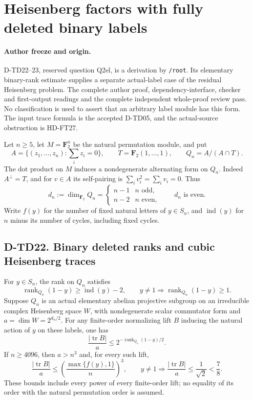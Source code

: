 \section{Heisenberg factors with fully deleted binary labels}
\label{sec:heisenberg-deleted-labels}

\paragraph{Author freeze and origin.}
D-TD22--23, reserved question Q2el, is a derivation by
\texttt{/root}. Its elementary binary-rank estimate supplies a
separate actual-label case of the residual Heisenberg problem.
The complete author proof, dependency-interface, checker and first-output
readings and the complete independent whole-proof review pass.
No classification is used to assert that an arbitrary label module
has this form. The input trace formula is the accepted D-TD05,
and the actual-source obstruction is HD-FT27.

Let $n\ge5$, let $M=\mathbf F_2^n$ be the natural permutation
module, and put
\[
 A=\{(z_1,\ldots,z_n):\textstyle\sum_i z_i=0\},\qquad
 T=\mathbf F_2(1,\ldots,1),\qquad
 Q_n=A/(A\cap T).
 \tag{TDB.1}
\]
The dot product on $M$ induces a nondegenerate alternating form
on $Q_n$. Indeed $A^\perp=T$, and for $v\in A$ its self-pairing
is $\sum_i v_i^2=\sum_i v_i=0$. Thus
\[
 d_n:=\dim_{\mathbf F_2}Q_n=
 \begin{cases}n-1&n\text{ odd},\\n-2&n\text{ even},\end{cases}
 \qquad d_n\text{ is even}.
 \tag{TDB.2}
\]
Write $f(y)$ for the number of fixed natural letters of $y\in S_n$,
and $\operatorname{ind}(y)$ for $n$ minus its number of cycles,
including fixed cycles.

\subsection*{D-TD22. Binary deleted ranks and cubic Heisenberg traces}

\begin{lemma}[D-TD22]
For $y\in S_n$, the rank on $Q_n$ satisfies
\[
 \operatorname{rank}_{Q_n}(1-y)\ge\operatorname{ind}(y)-2,
 \qquad y\ne1\Longrightarrow
                \operatorname{rank}_{Q_n}(1-y)\ge1.
 \tag{TDB.3}
\]
Suppose $Q_n$ is an actual elementary abelian projective subgroup
on an irreducible complex Heisenberg space $W$, with nondegenerate
scalar commutator form and $a=\dim W=2^{d_n/2}$.
For any finite-order normalizing lift $B$ inducing the natural
action of $y$ on these labels, one has
\[
 \frac{|\operatorname{tr}B|}{a}
 \le 2^{-\operatorname{rank}_{Q_n}(1-y)/2}.
 \tag{TDB.4}
\]
If $n\ge4096$, then $a>n^3$ and, for every such lift,
\[
 \frac{|\operatorname{tr}B|}{a}
 \le\left(\frac{\max\{f(y),1\}}n\right)^3,
 \qquad y\ne1\Longrightarrow
 \frac{|\operatorname{tr}B|}{a}\le\frac1{\sqrt2}<\frac78.
 \tag{TDB.5}
\]
These bounds include every power of every finite-order lift;
no equality of its order with the natural permutation order is assumed.
\end{lemma}

